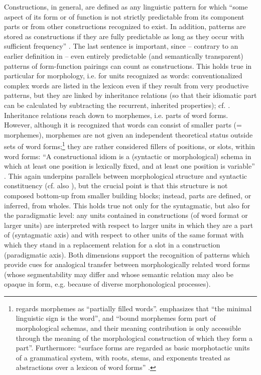 \documentclass[output=paper]{langscibook}
\begin{document}
Constructions, in general, are defined as any linguistic pattern for which “some  aspect of its form or of function is not strictly predictable from its component parts or from other constructions recognized to exist. In addition, patterns are stored as constructions if they are fully predictable as long as they occur with sufficient frequency” \citep[5]{Goldberg2006}. The last sentence is important, since – contrary to an earlier definition in \citet[4]{Goldberg1995} – even entirely predictable (and semantically transparent) patterns of form-function pairings can count as constructions. This holds true in particular for morphology, i.e. for units recognized as words: conventionalized complex words are listed in the lexicon even if they result from very productive patterns, but they are linked by inheritance relations (so that their idiomatic part can be calculated by subtracting the recurrent, inherited properties); cf. \citet[257--264]{Booij2013}. Inheritance relations reach down to morphemes, i.e. parts of word forms. However, although it is recognized that words can consist of smaller parts (= morphemes), morphemes are not given an independent theoretical status outside sets of word forms;\footnote{\citet[15]{Goldberg2013} regards morphemes as ``partially filled words''. \citet[15]{Booij2010} emphasizes that “the minimal linguistic sign is the word”, and “bound morphemes form part of morphological schemas, and their meaning contribution is only accessible through the meaning of the morphological construction of which they form a part”. Furthermore: “surface forms are regarded as basic morphotactic units of a grammatical system, with roots, stems, and exponents treated as abstractions over a lexicon of word forms” \citep[256]{Booij2010}.} they are rather considered fillers of positions, or slots, within word forms: “A constructional idiom is a (syntactic or morphological) schema in which at least one position is lexically fixed, and at least one position is variable” \citep[258]{Booij2013}. This again underpins parallels between morphological structure and syntactic constituency (cf. also \citealt{Booij2010}), but the crucial point is that this structure is not composed bottom-up from smaller building blocks; instead, parts are defined, or inferred, from wholes. This holds true not only for the syntagmatic, but also for the paradigmatic level: any units contained in constructions (of word format or larger units) are interpreted with respect to larger units in which they are a part of (syntagmatic axis) and with respect to other units of the same format with which they stand in a replacement relation for a slot in a construction (paradigmatic axis). Both dimensions support the recognition of patterns which provide cues for analogical transfer between morphologically related word forms (whose segmentability may differ and whose semantic relation may also be opaque in form, e.g. because of diverse morphonological processes).
\end{document}
